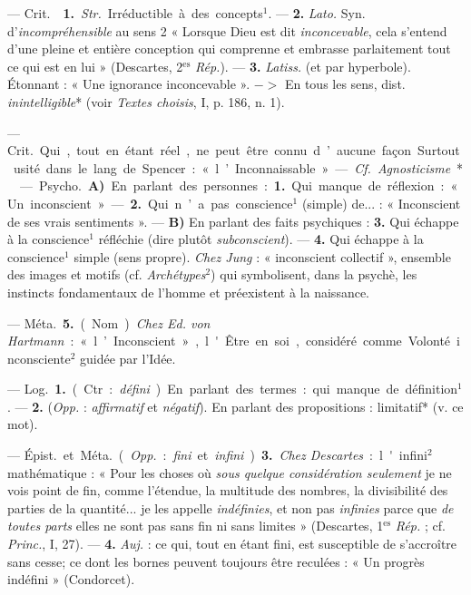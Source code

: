 \begin{itemize}[leftmargin=1cm, label=, itemsep=1pt]
 — \si{Crit.}  {\bf 1.} {\it Str.}
Irréductible à des concepts$^1$. — {\bf 2.} {\it Lato.} Syn.
d'{\it incompréhensible} au sens 2 « Lorsque Dieu est dit {\it inconcevable},
cela s'entend d’une pleine et entière conception qui comprenne et embrasse
parlaitement tout ce qui est en lui » (Descartes, 2$^\text{es}$ {\it Rép.}).
—  {\bf 3.} {\it Latiss.} (et par hyperbole). Étonnant : « Une
ignorance inconcevable ». $->$ En tous les sens, dist. {\it inintelligible}*
(voir {\it Textes choisis}, I, p. 186, n. 1).

 — \si{Crit.} Qui, tout en étant réel, ne peut être connu
d’aucune façon. Surtout usité dans le lang. de Spencer : « l’Inconnaissable ».
— {\it Cf.} {\it Agnosticisme}*.

 — \si{Psycho.} {\bf A)} En parlant des personnes : {\bf 1.}
Qui manque de réflexion : « Un inconscient » —  {\bf 2.} Qui n’a pas
conscience$^1$ (simple) de... : « Inconscient de ses vrais sentiments ». —
{\bf B)} En parlant des faits psychiques : {\bf 3.} Qui échappe à la
conscience$^1$ réfléchie (dire plutôt {\it subconscient}). — {\bf 4.} Qui
échappe à la conscience$^1$ simple (sens propre). {\it Chez Jung} :
« inconscient collectif », ensemble des images et motifs (cf.
{\it Archétypes}$^2$) qui symbolisent, dans la psychè, les instincts
fondamentaux de l’homme et préexistent à la naissance.

— \si{Méta.} {\bf 5.} (Nom). {\it Chez Ed. von Hartmann} : « l’Inconscient »,
l'Être en soi, considéré comme Volonté inconsciente$^2$ guidée par l'Idée.

 — \si{Log.} {\bf 1.} (Ctr. : {\it défini}). En parlant des
termes : qui manque de définition$^1$. — {\bf 2.} ({\it Opp.} :
{\it affirmatif}
et {\it négatif}). En parlant des propositions : limitatif* (v. ce mot).

— \si{Épist.} et \si{Méta.} ({\it Opp.} : {\it fini} et {\it infini}).
{\bf 3.} {\it Chez Descartes} : l'infini$^2$ mathématique : « Pour les choses
où {\it sous quelque considération seulement} je ne vois point de fin, comme
l’étendue, la multitude des nombres, la divisibilité des parties de la
quantité... je les appelle {\it indéfinies}, et non pas {\it infinies} parce
que {\it de toutes parts} elles ne sont pas sans fin ni sans
limites » (Descartes, 1$^\text{es}$ {\it Rép.} ; cf. {\it Princ.}, I, 27). —
{\bf 4.} {\it Auj.} : ce qui, tout en étant fini, est susceptible de
s’accroître sans cesse; ce dont les bornes peuvent toujours être reculées :
« Un progrès indéfini » (Condorcet).


\end{itemize}
